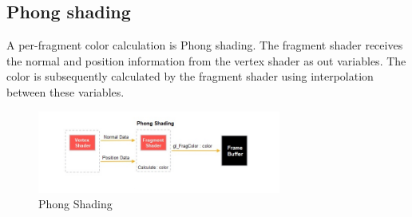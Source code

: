 \documentclass{article}
\begin{document}
\subsection{Phong shading}
A per-fragment color calculation is Phong shading. The fragment shader receives
the normal and position information from the vertex shader as out variables.
The color is subsequently calculated by the fragment shader using interpolation
between these variables.

\begin{figure}[htbp]
    \begin{center}
        \includegraphics*[width=8cm]{phong.jpg}
        \caption{Phong Shading}
    \end{center}
\end{figure}

\newpage
\end{document}
